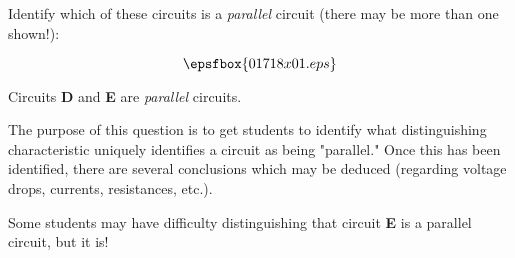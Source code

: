 

Identify which of these circuits is a {\it parallel} circuit (there may be more than one shown!):

$$\epsfbox{01718x01.eps}$$







Circuits {\bf D} and {\bf E} are {\it parallel} circuits.







The purpose of this question is to get students to identify what distinguishing characteristic uniquely identifies a circuit as being "parallel."  Once this has been identified, there are several conclusions which may be deduced (regarding voltage drops, currents, resistances, etc.).

Some students may have difficulty distinguishing that circuit {\bf E} is a parallel circuit, but it is!




